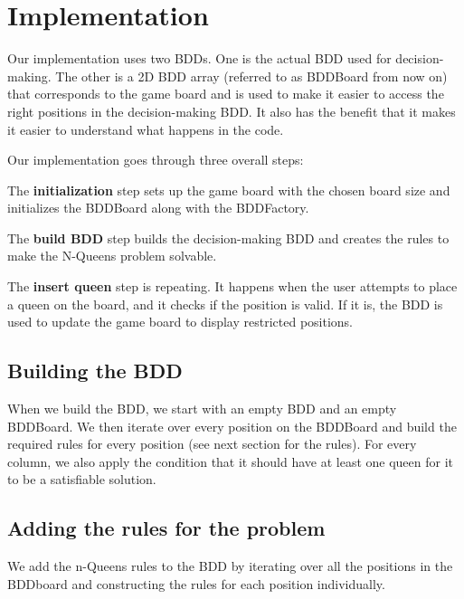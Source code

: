 \section{Implementation}
\label{Implementation}


Our implementation uses two BDDs. One is the actual BDD used for decision-making. The other is a 2D BDD array (referred to as BDDBoard from now on) that corresponds to the game board and is used to make it easier to access the right positions in the decision-making BDD. It also has the benefit that it makes it easier to understand what happens in the code.

Our implementation goes through three overall steps:
\begin{my_enumerate}

	\item The \textbf{initialization} step sets up the game board with the chosen board size and initializes the BDDBoard along with the BDDFactory.

	\item The \textbf{build BDD} step builds the decision-making BDD and creates the rules to make the N-Queens problem solvable.

	\item The \textbf{insert queen} step is repeating. It happens when the user attempts to place a queen on the board, and it checks if the position is valid. If it is, the BDD is used to update the game board to display restricted positions.

\end{my_enumerate}

\subsection{Building the BDD}

When we build the BDD, we start with an empty BDD and an empty BDDBoard. We then iterate over every position on the BDDBoard and build the required rules for every position (see next section for the rules). For every column, we also apply the condition that it should have at least one queen for it to be a satisfiable solution.

\subsection{Adding the rules for the problem}
We add the n-Queens rules to the BDD by iterating over all the positions in the BDDboard and constructing the rules for each position individually.

